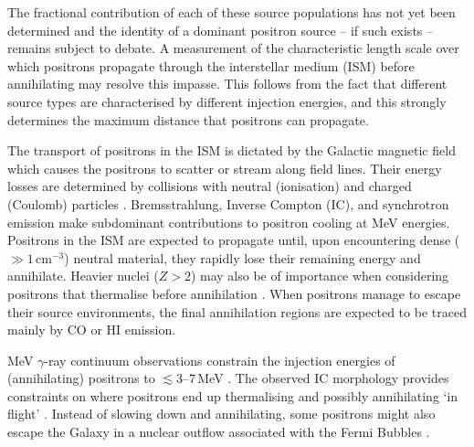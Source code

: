 \documentclass[doublespace,nopageskip]{VTthesis} %
\begin{document}
	
	The fractional contribution of each of these source populations has not yet been determined and the identity of a dominant positron source -- if such exists -- remains subject to debate.
	A measurement of the characteristic length scale over which positrons propagate through the interstellar medium (ISM) before annihilating may resolve this impasse.
	This follows from the fact that different source types are characterised by different injection energies, and this strongly determines the maximum distance that positrons can propagate.
	
	
	The transport of positrons in the ISM is dictated by the Galactic magnetic field which causes the positrons to scatter or stream along field lines.
	Their energy losses are determined by collisions with neutral (ionisation) and charged (Coulomb) particles \citep{Jean2009_511ISM,Martin2012_511,Alexis2014_511ISM,Panther2018_nuclear_outflow}. 
	Bremsstrahlung, Inverse Compton (IC), and synchrotron emission make subdominant contributions to positron cooling at MeV energies.
	Positrons in the ISM are expected to propagate until, upon encountering dense ($\gg 1\,\mathrm{cm^{-3}}$) neutral material, they rapidly lose their remaining energy and annihilate.
	Heavier nuclei ($Z > 2$) may also be of importance when considering positrons that thermalise before annihilation \citep{Panther2018_alkali511}.
	When positrons manage to escape their source environments, the final annihilation regions are expected to be traced mainly by CO or HI emission.
	
	MeV $\gamma$-ray continuum observations \citep{Strong2005_gammaconti,Strong2010_CR_luminosity} constrain the injection energies of (annihilating) positrons to $\lesssim 3$--$7$\,MeV \citep{Sizun2006_511,Beacom2006_511}.
	The observed IC morphology provides constraints on where positrons end up thermalising and possibly annihilating `in flight' \citep[e.g.,][]{Aharonyan1981_511}.
	Instead of slowing down and annihilating, some positrons might also escape the Galaxy in a nuclear outflow associated with the Fermi Bubbles \citep[FB;][]{Su2010_fermibubbles,Crocker2011_FB}.
	
\end{document}
